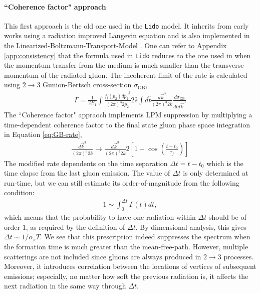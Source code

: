 \documentclass[aps, prc, reprint, amsmath, groupedaddress, nofootinbib]{revtex4-1}
\begin{document}
\paragraph*{``Coherence factor" approach} This first approach is the old one used in the {\tt Lido} model. 
It inherits from early works using a radiation improved Langevin equation \cite{Cao:2013ita} and is also implemented in the Linearized-Boltzmann-Transport-Model \cite{Cao:2016gvr,Cao:2017hhk}. 
One can refer to Appendix \ref{app:consistency} that the formula used in {\tt Lido} reduces to the one used in \cite{Cao:2013ita} when the momentum transfer from the medium is much smaller than the transverse momentum of the radiated gluon.
The incoherent limit of the rate is calculated using $2\rightarrow 3$ Gunion-Bertsch cross-section $\sigma_\textrm{GB}$,
\begin{eqnarray}\label{eq:GB-rate}
\Gamma = \frac{1}{2E_1}\int\frac{f_i(p_2)d\vec{p_2}^3}{(2\pi)^3 2p_2}2\hat{s}\int d\hat{t}\frac{d\vec{k}^3}{(2\pi)^3 2k}\frac{d\sigma_{\textrm{GB}}}{d\hat{t}d\vec{k}^3}
\end{eqnarray}
The ``Coherence factor" appraoch implements LPM suppression by multiplying a time-dependent coherence factor to the final state gluon phase space integration in Equation \ref{eq:GB-rate},
\begin{eqnarray}
\frac{d\vec{k}^3}{(2\pi)^3 2k} \rightarrow \frac{d\vec{k}^3}{(2\pi)^3 2k} 2\left[1-\cos\left(\frac{t-t_0}{\tau_f}\right)\right]
\end{eqnarray}
The modified rate dependents on the time separation $\Delta t = t-t_0$ which is the time elapse from the last gluon emission.
The value of $\Delta t$ is only determined at run-time,
but we can still estimate its order-of-magnitude from the following condition:
\begin{eqnarray}
1 \sim \int_0^{\Delta t}\Gamma(t) dt,
\end{eqnarray}
which means that the probability to have one radiation within $\Delta t$ should be of order $1$, as required by the definition of $\Delta t$.
By dimensional analysis, this gives $\Delta t \sim 1/\alpha_s T$.
We see that this prescription indeed suppresses the spectrum when the formation time is much greater than the mean-free-path. 
However, multiple scatterings are not included since gluons are always produced in $2\rightarrow3$ processes.
Moreover, it introduces correlation between the locations of vertices of subsequent emissions;
especially, no matter how soft the previous radiation is, it affects the next radiation in the same way through $\Delta t$.
\end{document}

